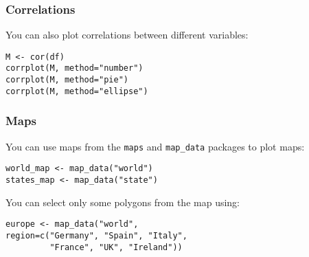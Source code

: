 \documentclass{beamer}
\begin{document}
	\begin{frame}[fragile]
		\frametitle{Correlations}

		You can also plot correlations between different variables:

		\vspace{2em}
	
		\begin{exampleblock}{}
		\begin{BVerbatim}
M <- cor(df)
corrplot(M, method="number")
corrplot(M, method="pie")
corrplot(M, method="ellipse")
		\end{BVerbatim}
		\end{exampleblock}{}

	\end{frame}

	\begin{frame}[fragile]
		\frametitle{Maps}

		You can use maps from the \verb|maps| and \verb|map_data| packages to plot maps:

		\vspace{1em}
	
		\begin{exampleblock}{}
		\begin{BVerbatim}
world_map <- map_data("world")
states_map <- map_data("state")
		\end{BVerbatim}
		\end{exampleblock}{}

		\vspace{1em}

		You can select only some polygons from the map using:

		\vspace{1em}

		\begin{exampleblock}{}
		\begin{BVerbatim}
europe <- map_data("world",
region=c("Germany", "Spain", "Italy",
         "France", "UK", "Ireland")) 
		\end{BVerbatim}
		\end{exampleblock}{}

	\end{frame}
\end{document}
